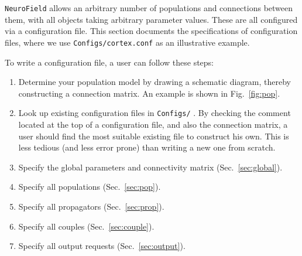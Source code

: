 \documentclass[12pt,a4paper]{article}
\newcommand{\type}[1]{ {\small\small\tt #1} }
\newcommand{\NF}[0]{ \type{NeuroField}}
\begin{document}
\NF allows an arbitrary number of populations and connections between them, with all objects taking arbitrary parameter values. These are all configured via a configuration file. This section documents the specifications of configuration files, where we use \type{Configs/cortex.conf} as an illustrative example.

To write a configuration file, a user can follow these steps:
\begin{enumerate}
\item Determine your population model by drawing a schematic diagram, thereby constructing a connection matrix. An example is shown in Fig.~\ref{fig:pop}.
\item Look up existing configuration files in \type{Configs/}. By checking the comment located at the top of a configuration file, and also the connection matrix, a user should find the most suitable existing file to construct his own. This is less tedious (and less error prone) than writing a new one from scratch.
\item Specify the global parameters and connectivity matrix (Sec.~\ref{sec:global}).
\item Specify all populations (Sec.~\ref{sec:pop}).
\item Specify all propagators (Sec.~\ref{sec:prop}).
\item Specify all couples (Sec.~\ref{sec:couple}).
\item Specify all output requests (Sec.~\ref{sec:output}).
\end{enumerate}
\end{document}
